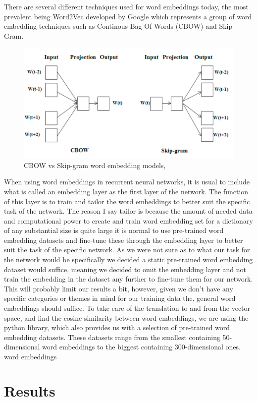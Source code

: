 \documentclass[12pt]{article}
\begin{document}
There are several different techniques used for word embeddings today, the most prevalent being Word2Vec developed by Google which represents a group of word embedding techniques such as Continous-Bag-Of-Words (CBOW) and Skip-Gram. 

\begin{figure}
    \centering
    \includegraphics[width=0.5\linewidth]{figures/skip_gram_vs_cbow.png}
    \caption{CBOW vs Skip-gram word embedding models, \cite{jatnika2019word2vec}}
    \label{fig:enter-label}
\end{figure}

When using word embeddings in recurrent neural networks, it is usual to include what is called an embedding layer as the first layer of the network. The function of this layer is to train and tailor the word embeddings to better suit the specific task of the network. The reason I say tailor is because the amount of needed data and computational power to create and train word embedding set for a dictionary of any substantial size is quite large it is normal to use pre-trained word embedding datasets and fine-tune these through the embedding layer to better suit the task of the specific network. As we were not sure as to what our task for the network would be specifically we decided a static pre-trained word embedding dataset would suffice, meaning we decided to omit the embedding layer and not train the embedding in the dataset any further to fine-tune them for our network. This will probably limit our results a bit, however, given we don't have any specific categories or themes in mind for our training data the, general word embeddings should suffice.
To take care of the translation to and from the vector space, and find the cosine similarity between word embeddings, we are using the \cite{Spacy} python library, which also provides us with a selection of pre-trained word embedding datasets. These datasets range from the smallest containing 50-dimensional word embeddings to the biggest containing 300-dimensional ones.
word embeddings

\section{Results}
\end{document}
